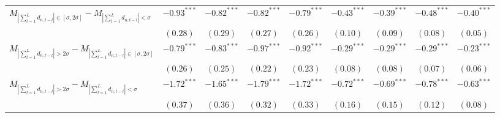 \begin{tabular}{lcccccccc}
 \hline$M_{\left|\sum_{l=1}^L d_{n,t-l}\right| \in [\sigma, 2\sigma]}-M_{\left|\sum_{l=1}^L d_{n,t-l}\right| < \sigma}$ & $-0.93^{***}$ & $-0.82^{***}$ & $-0.82^{***}$ & $-0.79^{***}$ & $-0.43^{***}$ & $-0.39^{***}$ & $-0.48^{***}$ & $-0.40^{***}$ \\ 
   & $(0.28)$ & $(0.29)$ & $(0.27)$ & $(0.26)$ & $(0.10)$ & $(0.09)$ & $(0.08)$ & $(0.05)$ \\ 
  $M_{\left|\sum_{l=1}^L d_{n,t-l}\right| > 2 \sigma}-M_{\left|\sum_{l=1}^L d_{n,t-l}\right| \in [\sigma, 2\sigma]}$ & $-0.79^{***}$ & $-0.83^{***}$ & $-0.97^{***}$ & $-0.92^{***}$ & $-0.29^{***}$ & $-0.29^{***}$ & $-0.29^{***}$ & $-0.23^{***}$ \\ 
   & $(0.26)$ & $(0.25)$ & $(0.22)$ & $(0.23)$ & $(0.08)$ & $(0.08)$ & $(0.07)$ & $(0.06)$ \\ 
  $M_{\left|\sum_{l=1}^L d_{n,t-l}\right| > 2 \sigma}-M_{\left|\sum_{l=1}^L d_{n,t-l}\right| < \sigma}$ & $-1.72^{***}$ & $-1.65^{***}$ & $-1.79^{***}$ & $-1.72^{***}$ & $-0.72^{***}$ & $-0.69^{***}$ & $-0.78^{***}$ & $-0.63^{***}$ \\ 
   & $(0.37)$ & $(0.36)$ & $(0.32)$ & $(0.33)$ & $(0.16)$ & $(0.15)$ & $(0.12)$ & $(0.08)$ \\ 
   \hline 
\end{tabular}
